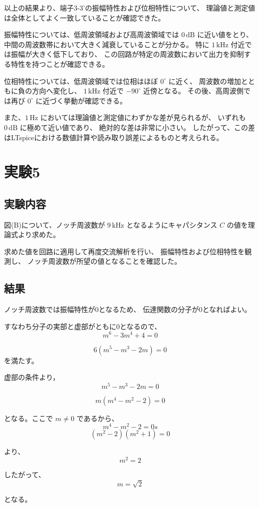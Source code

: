 \documentclass[article]{jlreq}
\begin{document}
以上の結果より、端子3-3'の振幅特性および位相特性について、
理論値と測定値は全体としてよく一致していることが確認できた。

振幅特性については、低周波領域および高周波領域では
$0\,\mathrm{dB}$ に近い値をとり、
中間の周波数帯において大きく減衰していることが分かる。
特に $1\,\mathrm{kHz}$ 付近では振幅が大きく低下しており、
この回路が特定の周波数において出力を抑制する特性を持つことが確認できる。

位相特性については、低周波領域では位相はほぼ $0^\circ$ に近く、
周波数の増加とともに負の方向へ変化し、
$1\,\mathrm{kHz}$ 付近で $-90^\circ$ 近傍となる。
その後、高周波側では再び $0^\circ$ に近づく挙動が確認できる。

また、$1\,\mathrm{Hz}$ においては理論値と測定値にわずかな差が見られるが、
いずれも $0\,\mathrm{dB}$ に極めて近い値であり、
絶対的な差は非常に小さい。
したがって、この差はLTspiceにおける数値計算や読み取り誤差によるものと考えられる。



\section{実験5}
\subsection{実験内容}
図(B)について、ノッチ周波数が
$
9\,\mathrm{kHz}
$
となるようにキャパシタンス $C$ の値を理論式より求めた。

求めた値を回路に適用して再度交流解析を行い、
振幅特性および位相特性を観測し、
ノッチ周波数が所望の値となることを確認した。

\subsection{結果}
ノッチ周波数では振幅特性が0となるため、
伝達関数の分子が0となればよい。

すなわち分子の実部と虚部がともに0となるので、
\[
m^6-3m^4+4=0
\]

\[
6(m^5-m^3-2m)=0
\]
を満たす。

虚部の条件より，
\[
m^5-m^3-2m=0
\]

\[
m(m^4-m^2-2)=0
\]

となる。ここで $m\neq0$ であるから、
\[
m^4-m^2-2=0s
\]
\[
(m^2-2)(m^2+1)=0
\]

より、
\[
m^2=2
\]

したがって、
\[
m=\sqrt{2}
\]

となる。
\end{document}

